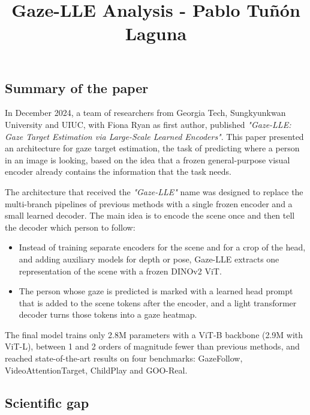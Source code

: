 \documentclass[12pt]{article}
\title{\vspace{-3cm}\textbf{Gaze-LLE Analysis - Pablo Tuñón Laguna}\vspace{-2cm}}
\begin{document}
\date{}

\maketitle

\subsection*{Summary of the paper}

In December 2024, a team of researchers from Georgia Tech, Sungkyunkwan University and UIUC, with Fiona Ryan as first author, published \textit{"Gaze-LLE: Gaze Target Estimation via Large-Scale Learned Encoders"}. This paper presented an architecture for gaze target estimation,
the task of predicting where a person in an image is looking, based on the idea that a frozen general-purpose visual encoder already contains the information that the task needs.

\vspace{0.5cm}

The architecture that received the \textit{"Gaze-LLE"} name was designed to replace the multi-branch pipelines of previous methods with a single frozen encoder and a small learned decoder.
The main idea is to encode the scene once and then tell the decoder which person to follow:
\begin{itemize}
    \item Instead of training separate encoders for the scene and for a crop of the head, and adding auxiliary models for depth or pose, Gaze-LLE extracts one representation of the scene with a frozen DINOv2 ViT.
    \item The person whose gaze is predicted is marked with a learned head prompt that is added to the scene tokens after the encoder, and a light transformer decoder turns those tokens into a gaze heatmap.
\end{itemize}

\vspace{0.5cm}

The final model trains only 2.8M parameters with a ViT-B backbone (2.9M with ViT-L), between 1 and 2 orders of magnitude fewer than previous methods, and reached state-of-the-art results on four benchmarks: GazeFollow, VideoAttentionTarget, ChildPlay and GOO-Real.

\vspace{0.5cm}

\subsection*{Scientific gap}
\end{document}
